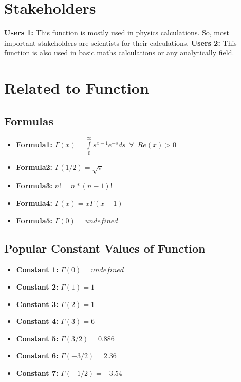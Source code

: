 \documentclass{article}
\begin{document}
\section{Stakeholders} 
\textbf{Users 1:} This function is mostly used in physics calculations. So, most important stakeholders are scientists for their calculations.
\newline \newline
\textbf{Users 2:} This function is also used in basic maths calculations or any analytically field. 



\section{Related to Function}
\subsection{Formulas}
\begin{itemize}
\item \textbf{Formula1: } $  \Gamma \left( x \right) = \int\limits_0^\infty {s^{x - 1} e^{ - s} ds} \enspace \forall \enspace Re(x)>0$
\item \textbf{Formula2: } $  \Gamma \left( 1/2 \right) = \sqrt{\pi}$
\item \textbf{Formula3: } $  n! = n*(n-1)!$
\item \textbf{Formula4: } $  \Gamma \left( x \right) = x\Gamma \left( x-1\right) $
\item \textbf{Formula5: } $  \Gamma \left( 0 \right) = undefined $
\end{itemize}
\subsection{Popular Constant Values of Function}
\begin{itemize}
\item \textbf{Constant 1: } $  \Gamma \left( 0 \right) = undefined $
\item \textbf{Constant 2: } $  \Gamma \left( 1 \right) = 1 $
\item \textbf{Constant 3: } $  \Gamma \left( 2 \right) = 1 $
\item \textbf{Constant 4: } $  \Gamma \left( 3 \right) = 6 $
\item \textbf{Constant 5: } $  \Gamma \left( 3/2 \right) = 0.886 $
\item \textbf{Constant 6: } $  \Gamma \left( -3/2 \right) = 2.36 $
\item \textbf{Constant 7: } $  \Gamma \left( -1/2 \right) = -3.54 $
\end{itemize}
\end{document}
